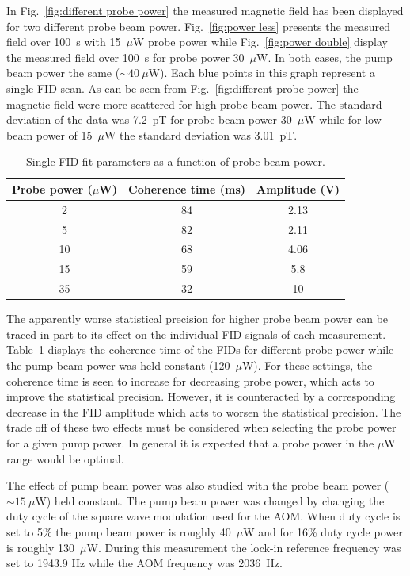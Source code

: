 In Fig.~\ref{fig:different probe power} the measured magnetic field
has been displayed for two different probe beam
power. Fig.~\ref{fig:power less} presents the measured field over
100~s with 15~$\mu$W probe power while Fig.~\ref{fig:power double}
display the measured field over 100~s for probe power 30~$\mu$W. In
both cases, the pump beam power the same ($\sim 40~\mu$W). Each blue
points in this graph represent a single FID scan. As can be seen from
Fig.~\ref{fig:different probe power} the magnetic field were more
scattered for high probe beam power.  The standard deviation of the
data was 7.2~pT for probe beam power 30~$\mu$W while for low beam
power of 15~$\mu$W the standard deviation was 3.01~pT.

\begin{table}%
\centering
\begin{tabular}{|c|c|c|}\hline
\textbf{Probe power ($\mu$W)}    & \textbf{Coherence time (ms)}  & \textbf{Amplitude (V)}\\\hline
2 & 84 & 2.13   \\
5    & 82 & 2.11  \\
10   &  68 & 4.06 \\
15  &   59 & 5.8  \\
35  &   32 & 10  \\\hline
\end{tabular}
\caption{Single FID fit parameters as a function of probe beam
  power.\label{tab:coh}}
\end{table}

The apparently worse statistical precision for higher probe beam power
can be traced in part to its effect on the individual FID signals of
each measurement.  Table~\ref{tab:coh} displays the coherence time of
the FIDs for different probe power while the pump beam power was held
constant (120~$\mu$W).  For these settings, the coherence time is seen
to increase for decreasing probe power, which acts to improve the
statistical precision.  However, it is counteracted by a corresponding
decrease in the FID amplitude which acts to worsen the statistical
precision.  The trade off of these two effects must be considered when
selecting the probe power for a given pump power.  In general it is
expected that a probe power in the $\mu$W range would be optimal.
 
The effect of pump beam power was also studied with the probe beam
power ($\sim 15~\mu$W) held constant.  The pump beam power was changed
by changing the duty cycle of the square wave modulation used for the
AOM.  When duty cycle is set to 5\% the pump beam power is roughly
40~$\mu$W and for 16\% duty cycle power is roughly 130~$\mu$W. During
this measurement the lock-in reference frequency was set to 1943.9 Hz
while the AOM frequency was 2036~Hz.

